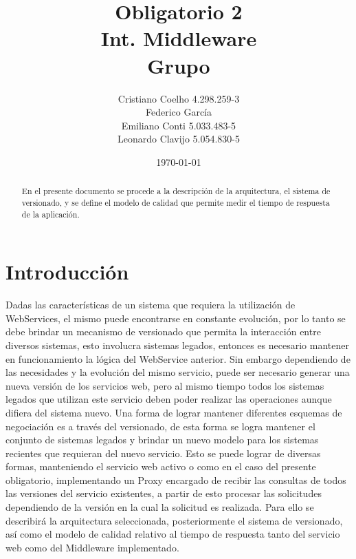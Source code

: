 \documentclass[12pt]{article}
\title{Obligatorio 2 \\ Int. Middleware \\ Grupo }
\author{
  Cristiano Coelho 4.298.259-3\\
  Federico García \\
  Emiliano Conti 5.033.483-5\\
  Leonardo Clavijo 5.054.830-5
}
\date{\today}
\begin{document}
\maketitle

\begin{abstract}
En el presente documento se procede a la descripción de la arquitectura, el sistema de versionado,  y se define el modelo de calidad que permite medir el tiempo de respuesta de la aplicación.
\end{abstract}

\newpage
\tableofcontents
\newpage

\section{Introducción}
Dadas las características de un sistema que requiera la utilización de WebServices, el mismo puede encontrarse en constante evolución, por lo tanto se debe brindar un mecanismo de versionado que permita la interacción entre diversos sistemas, esto involucra sistemas legados, entonces es necesario mantener en funcionamiento la lógica del WebService anterior. Sin embargo dependiendo de las necesidades y la evolución del mismo servicio, puede ser necesario generar una nueva versión de los servicios web, pero al mismo tiempo todos los sistemas legados que utilizan este servicio deben poder realizar las operaciones aunque difiera del sistema nuevo.
Una forma de lograr mantener diferentes esquemas de negociación es a través del versionado, de esta forma se logra mantener el conjunto de sistemas legados y brindar un nuevo modelo para los sistemas recientes que requieran del nuevo servicio. Esto se puede lograr de diversas formas, manteniendo el servicio web activo o como en el caso del presente obligatorio, implementando un Proxy encargado de recibir las consultas de todos las versiones del servicio existentes, a partir de esto procesar las solicitudes dependiendo de la versión en la cual la solicitud es realizada. Para ello se describirá la arquitectura seleccionada, posteriormente el sistema de versionado, así como el modelo de calidad relativo al tiempo de respuesta tanto del servicio web como del Middleware implementado.
\end{document}

